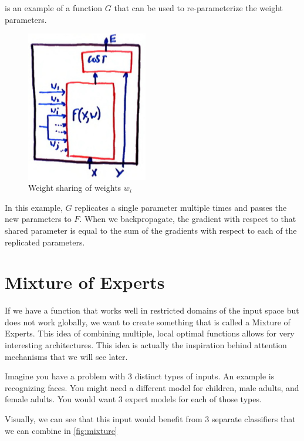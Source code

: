  is an example of a function $G$ that can be used to re-parameterize the weight parameters.

\begin{figure}
    \centering
    \includegraphics[width=150pt]{lectures/03-a/images/weight_sharing.png}
    \caption{Weight sharing of weights $w_{i}$}
    \label{fig:sharing}
\end{figure}

In this example, $G$ replicates a single parameter multiple times and passes the new parameters to $F$. 
When we backpropagate, the gradient with respect to that shared parameter is equal to the sum of the gradients with respect to each of the replicated parameters.

\section{Mixture of Experts}

If we have a function that works well in restricted domains of the input space but does not work globally, we want to create something that is called a Mixture of Experts. 
This idea of combining multiple, local optimal functions allows for very interesting architectures. 
This idea is actually the inspiration behind attention mechanisms that we will see later. 

Imagine you have a problem with 3 distinct types of inputs. 
An example is recognizing faces. 
You might need a different model for children, male adults, and female adults. 
You would want 3 expert models for each of those types.

Visually, we can see that this input would benefit from 3 separate classifiers that we can combine in \cref{fig:mixture}

